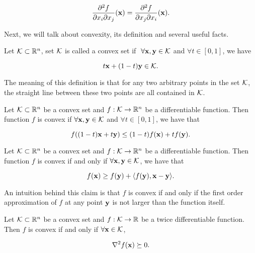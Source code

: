 \documentclass[../main.tex]{subfiles}
\begin{document}
\begin{equation*}
	\frac{\partial ^2 f}{\partial x_i \partial x_j} (\mathbf{x}) = \frac{\partial ^2 f}{\partial x_j \partial x_i} (\mathbf{x}).
\end{equation*}

Next, we will talk about convexity, its definition and several useful facts.

\begin{definition}
	Let $\mathcal{K} \subset \mathbb{R}^n$, set $\mathcal{K}$ is called a convex set if  $\ \forall \mathbf{x},\mathbf{y} \in \mathcal{K}$ and $\forall t \in [0,1]$, we have
	
	\begin{equation}
		t\mathbf{x} + (1-t)\mathbf{y} \in \mathcal{K}.
	\end{equation}
	
	The meaning of this definition is that for any two arbitrary points in the set $\mathcal{K}$, the straight line between these two points are all contained in $\mathcal{K}$.
\end{definition}

\begin{definition}
	Let $\mathcal{K} \subset \mathbb{R}^n$ be a convex set and $f: \mathcal{K} \to \mathbb{R}^n$ be a differentiable function. Then function $f$ is convex if $\forall \mathbf{x},\mathbf{y} \in \mathcal{K}$ and $\forall t\in [0, 1]$, we have that
	
	\begin{equation}
	f((1-t)\mathbf{x} + t \mathbf{y}) \leq (1-t) f(\mathbf{x})+ t f(\mathbf{y}). \label{convex_f_1}
	\end{equation}
\end{definition}


\begin{claim}
	Let $\mathcal{K} \subset \mathbb{R}^n$ be a convex set and $f: \mathcal{K} \to \mathbb{R}^n$ be a differentiable function. Then function $f$ is convex if and only if $\forall \mathbf{x},\mathbf{y} \in \mathcal{K}$, we have that
	
	\begin{equation}
		f(\mathbf{x}) \geq f(\mathbf{y}) + \langle f(\mathbf{y}) , \mathbf{x} - \mathbf{y} \rangle. \label{convex_f_2}
	\end{equation}
\end{claim}

An intuition behind this claim is that $f$ is convex if and only if the first order approximation of $f$ at any point $\mathbf{y}$ is not larger than the function itself.
\begin{claim}
	Let $\mathcal{K} \subset \mathbb{R}^n$ be a convex set and $f: \mathcal{K} \to \mathbb{R}$ be a twice differentiable function. Then $f$ is convex if and only if  $\forall \mathbf{x} \in \mathcal{K}$, 
	
	\begin{equation}
		\nabla^2 f(\mathbf{x}) \succeq 0. \label{convex_f_3}
	\end{equation}
\end{claim}
\end{document}
